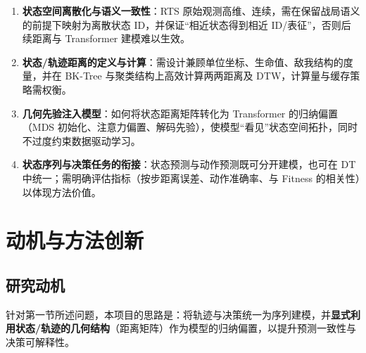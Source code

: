 \documentclass[UTF8,11pt]{ctexart}
\begin{document}
\begin{enumerate}[leftmargin=*]
    \item \textbf{状态空间离散化与语义一致性}：RTS 原始观测高维、连续，需在保留战局语义的前提下映射为离散状态 ID，并保证“相近状态得到相近 ID/表征”，否则后续距离与 Transformer 建模难以生效。
    \item \textbf{状态/轨迹距离的定义与计算}：需设计兼顾单位坐标、生命值、敌我结构的度量，并在 BK-Tree 与聚类结构上高效计算两两距离及 DTW，计算量与缓存策略需权衡。
    \item \textbf{几何先验注入模型}：如何将状态距离矩阵转化为 Transformer 的归纳偏置（MDS 初始化、注意力偏置、解码先验），使模型“看见”状态空间拓扑，同时不过度约束数据驱动学习。
    \item \textbf{状态序列与决策任务的衔接}：状态预测与动作预测既可分开建模，也可在 DT 中统一；需明确评估指标（按步距离误差、动作准确率、与 Fitness 的相关性）以体现方法价值。
\end{enumerate}

\vspace{0.5em}

\section{动机与方法创新}
\label{sec:motivation}

\subsection{研究动机}
针对第一节所述问题，本项目的思路是：将轨迹与决策统一为序列建模，并\textbf{显式利用状态/轨迹的几何结构}（距离矩阵）作为模型的归纳偏置，以提升预测一致性与决策可解释性。
\end{document}
